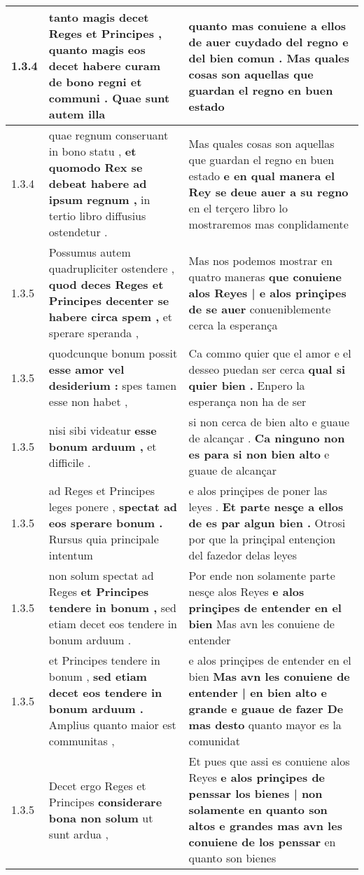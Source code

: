 \begin{tabular}{|p{1cm}|p{6.5cm}|p{6.5cm}|}
1.3.4 & tanto magis decet Reges et Principes , quanto magis eos decet \textbf{ habere curam de bono regni et communi . } Quae sunt autem illa & quanto mas conuiene a ellos \textbf{ de auer cuydado del regno e del bien comun . } Mas quales cosas son aquellas que guardan el regno en buen estado \\\hline
1.3.4 & quae regnum conseruant in bono statu , \textbf{ et quomodo Rex se debeat habere ad ipsum regnum , } in tertio libro diffusius ostendetur . & Mas quales cosas son aquellas que guardan el regno en buen estado \textbf{ e en qual manera el Rey se deue auer a su regno } en el terçero libro lo mostraremos mas conplidamente \\\hline
1.3.5 & Possumus autem quadrupliciter ostendere , \textbf{ quod deces Reges et Principes decenter se habere circa spem , } et sperare speranda , & Mas nos podemos mostrar en quatro maneras \textbf{ que conuiene alos Reyes | e alos prinçipes de se auer } conueniblemente cerca la esperança \\\hline
1.3.5 & quodcunque bonum possit \textbf{ esse amor vel desiderium : } spes tamen esse non habet , & Ca commo quier que el amor e el desseo puedan ser cerca \textbf{ qual si quier bien . } Enpero la esperança non ha de ser \\\hline
1.3.5 & nisi sibi videatur \textbf{ esse bonum arduum , } et difficile . & si non cerca de bien alto e guaue de alcançar . \textbf{ Ca ninguno non es para si non bien alto } e guaue de alcançar \\\hline
1.3.5 & ad Reges et Principes leges ponere , \textbf{ spectat ad eos sperare bonum . } Rursus quia principale intentum & e alos prinçipes de poner las leyes . \textbf{ Et parte nesçe a ellos de es par algun bien . } Otrosi por que la prinçipal entençion del fazedor delas leyes \\\hline
1.3.5 & non solum spectat ad Reges \textbf{ et Principes tendere in bonum , } sed etiam decet eos tendere in bonum arduum . & Por ende non solamente parte nesçe alos Reyes \textbf{ e alos prinçipes de entender en el bien } Mas avn les conuiene de entender \\\hline
1.3.5 & et Principes tendere in bonum , \textbf{ sed etiam decet eos tendere in bonum arduum . } Amplius quanto maior est communitas , & e alos prinçipes de entender en el bien \textbf{ Mas avn les conuiene de entender | en bien alto e grande e guaue de fazer De mas desto } quanto mayor es la comunidat \\\hline
1.3.5 & Decet ergo Reges et Principes \textbf{ considerare bona non solum } ut sunt ardua , & Et pues que assi es conuiene alos Reyes \textbf{ e alos prinçipes de penssar los bienes | non solamente en quanto son altos e grandes mas avn les conuiene de los penssar } en quanto son bienes \\\hline

\end{tabular}
